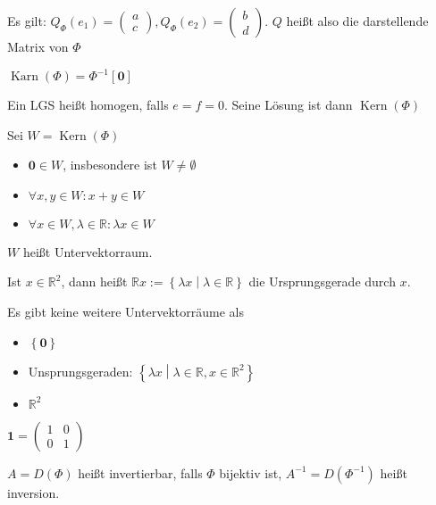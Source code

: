 \begin{remark}
  Es gilt: $Q_{\Phi}(e_1) =
  \begin{pmatrix}
    a\\c
  \end{pmatrix}
  , Q_{\Phi}(e_2) =
  \begin{pmatrix}
    b\\d
  \end{pmatrix}
  $.
  $Q$ heißt also die darstellende Matrix von $\Phi$
\end{remark}

\begin{definition}
  $\operatorname{Karn}(\Phi) = \Phi^{-1}[\mathbf{0}]$

  Ein LGS heißt homogen, falls $e = f = 0$. Seine Lösung ist dann $\operatorname{Kern}(\Phi)$
\end{definition}
\begin{proposition}
  Sei $W = \operatorname{Kern}(\Phi)$
  \begin{itemize}
  \item $\mathbf{0} \in W$, insbesondere ist $W \ne \emptyset$
  \item $\forall x, y \in W: x+y \in W$
  \item $\forall x \in W, \lambda \in \mathbb{R}: \lambda x \in W$
  \end{itemize}
  $W$ heißt Untervektorraum.
\end{proposition}
\begin{definition}[Ursprungsgerade]
  Ist $x \in \mathbb{R}^2$, dann heißt $\mathbb{R}x := \left\{ \lambda x \middle| \lambda \in \mathbb{R} \right\}$ die Ursprungsgerade durch $x$.
\end{definition}
\begin{theorem}
  Es gibt keine weitere Untervektorräume als
  \begin{itemize}
  \item $\left\{ \mathbf{0} \right\}$
  \item Unsprungsgeraden: $\left\{ \lambda x \middle| \lambda \in \mathbb{R}, x \in \mathbb{R}^2 \right\}$
  \item $\mathbb{R}^2$
  \end{itemize}
\end{theorem}


\begin{remark}[Einheitsmatrix]
  $\mathbf{1} =
    \begin{pmatrix}
      1 & 0 \\ 0 & 1
    \end{pmatrix}$
\end{remark}
\begin{definition}
  $A = D(\Phi)$ heißt invertierbar, falls $\Phi$ bijektiv ist, $A^{-1} = D(\Phi^{-1})$ heißt inversion.
\end{definition}

